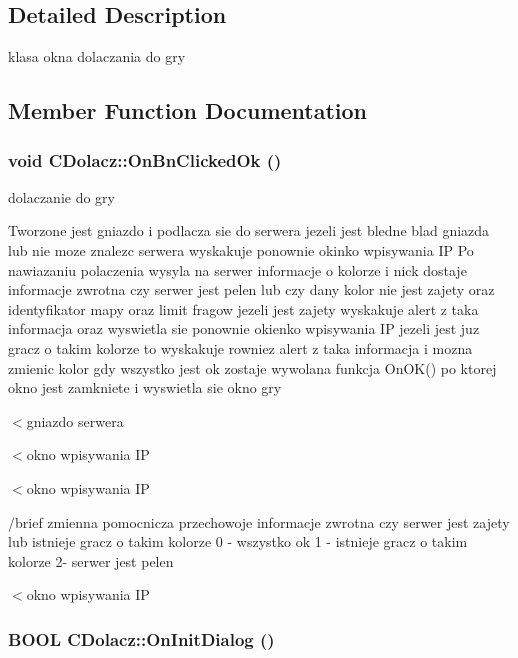 \subsection{Detailed Description}
klasa okna dolaczania do gry 



\subsection{Member Function Documentation}
\subsubsection{\setlength{\rightskip}{0pt plus 5cm}void CDolacz::OnBnClickedOk ()}\label{class_c_dolacz_1f292ca9f4124419e692bd46612b7330}


dolaczanie do gry 

Tworzone jest gniazdo i podlacza sie do serwera jezeli jest bledne blad gniazda lub nie moze znalezc serwera wyskakuje ponownie okinko wpisywania IP Po nawiazaniu polaczenia wysyla na serwer informacje o kolorze i nick dostaje informacje zwrotna czy serwer jest pelen lub czy dany kolor nie jest zajety oraz identyfikator mapy oraz limit fragow jezeli jest zajety wyskakuje alert z taka informacja oraz wyswietla sie ponownie okienko wpisywania IP jezeli jest juz gracz o takim kolorze to wyskakuje rowniez alert z taka informacja i mozna zmienic kolor gdy wszystko jest ok zostaje wywolana funkcja OnOK() po ktorej okno jest zamkniete i wyswietla sie okno gry 

$<$gniazdo serwera

$<$okno wpisywania IP

$<$okno wpisywania IP

/brief zmienna pomocnicza przechowoje informacje zwrotna czy serwer jest zajety lub istnieje gracz o takim kolorze 0 - wszystko ok 1 - istnieje gracz o takim kolorze 2- serwer jest pelen

$<$okno wpisywania IP 
\subsubsection{\setlength{\rightskip}{0pt plus 5cm}BOOL CDolacz::OnInitDialog ()\hspace{0.3cm}{\tt  [virtual]}}\label{class_c_dolacz_de393dc6b91f5ab5a18f821077c193f5}



